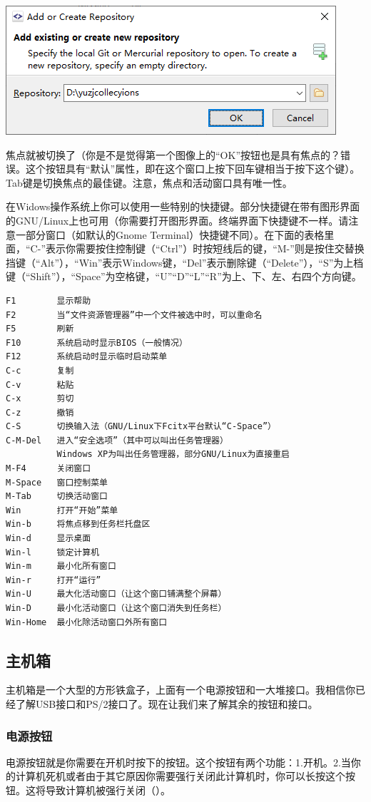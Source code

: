 \begin{center}
	\includegraphics{pic/forcus4}
\end{center} \par
焦点就被切换了（你是不是觉得第一个图像上的“OK”按钮也是具有焦点的？错误。这个按钮具有“默认”属性，即在这个窗口上按下回车键相当于按下这个键）。Tab键是切换焦点的最佳键。注意，焦点和活动窗口具有唯一性。\par
在Widows操作系统上你可以使用一些特别的快捷键。部分快捷键在带有图形界面的GNU/Linux上也可用（你需要打开图形界面。终端界面下快捷键不一样。请注意一部分窗口（如默认的Gnome Terminal）快捷键不同）。在下面的表格里面，“C-”表示你需要按住控制键（“Ctrl”）时按短线后的键，“M-”则是按住交替换挡键（“Alt”），“Win”表示Windows键，“Del”表示删除键（“Delete”），“S”为上档键（“Shift”），“Space”为空格键，“U”“D”“L”“R”为上、下、左、右四个方向键。
\begin{verbatim}
F1        显示帮助
F2        当“文件资源管理器”中一个文件被选中时，可以重命名
F5        刷新
F10       系统启动时显示BIOS（一般情况）
F12       系统启动时显示临时启动菜单
C-c       复制
C-v       粘贴
C-x       剪切
C-z       撤销
C-S       切换输入法（GNU/Linux下Fcitx平台默认“C-Space”）
C-M-Del   进入“安全选项”（其中可以叫出任务管理器）
          Windows XP为叫出任务管理器，部分GNU/Linux为直接重启
M-F4      关闭窗口
M-Space   窗口控制菜单
M-Tab     切换活动窗口
Win       打开“开始”菜单
Win-b     将焦点移到任务栏托盘区
Win-d     显示桌面
Win-l     锁定计算机
Win-m     最小化所有窗口
Win-r     打开“运行”
Win-U     最大化活动窗口（让这个窗口铺满整个屏幕）
Win-D     最小化活动窗口（让这个窗口消失到任务栏）
Win-Home  最小化除活动窗口外所有窗口
\end{verbatim}
\subsection{主机箱}
主机箱是一个大型的方形铁盒子，上面有一个电源按钮和一大堆接口。我相信你已经了解USB接口和PS/2接口了。现在让我们来了解其余的按钮和接口。
\subsubsection{电源按钮}
电源按钮就是你需要在开机时按下的按钮。这个按钮有两个功能：1.开机。2.当你的计算机死机或者由于其它原因你需要强行关闭此计算机时，你可以长按这个按钮。这将导致计算机被强行关闭（{\color{red}{警告！不要尝试使用这种方法关闭计算机——这有可能导致严重的数据丢失！}}）。
